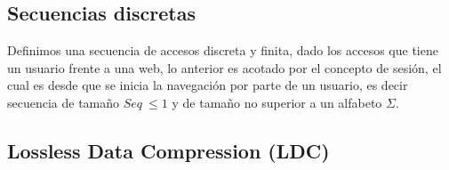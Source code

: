 



\subsection{Secuencias discretas}\label{concept-discret-seq}

Definimos una secuencia de accesos discreta y finita, dado los accesos que tiene un usuario frente a una web, lo anterior es acotado por el concepto de sesión, el cual es desde que se inicia la navegación por parte de un usuario, es decir secuencia de tamaño $Seq\ \leq 1$ y de tamaño no superior a un alfabeto $\Sigma$.



\subsection{Lossless Data Compression (LDC)} \label{concept-LDC}

